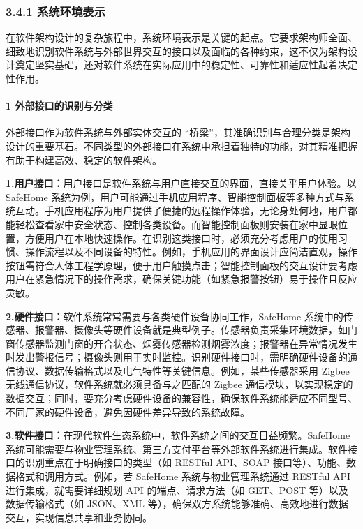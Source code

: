 \subsubsection{3.4.1 系统环境表示}\label{ux7cfbux7edfux73afux5883ux8868ux793a}

在软件架构设计的复杂旅程中，系统环境表示是关键的起点。它要求架构师全面、细致地识别软件系统与外部世界交互的接口以及面临的各种约束，这不仅为架构设计奠定坚实基础，还对软件系统在实际应用中的稳定性、可靠性和适应性起着决定性作用。

\paragraph{1 外部接口的识别与分类}\label{ux5916ux90e8ux63a5ux53e3ux7684ux8bc6ux522bux4e0eux5206ux7c7b}

外部接口作为软件系统与外部实体交互的 ``桥梁''，其准确识别与合理分类是架构设计的重要基石。不同类型的外部接口在系统中承担着独特的功能，对其精准把握有助于构建高效、稳定的软件架构。

\textbf{1.用户接口：}用户接口是软件系统与用户直接交互的界面，直接关乎用户体验。以 SafeHome 系统为例，用户可能通过手机应用程序、智能控制面板等多种方式与系统互动。手机应用程序为用户提供了便捷的远程操作体验，无论身处何地，用户都能轻松查看家中安全状态、控制各类设备。而智能控制面板则安装在家中显眼位置，方便用户在本地快速操作。在识别这类接口时，必须充分考虑用户的使用习惯、操作流程以及不同设备的特性。例如，手机应用的界面设计应简洁直观，操作按钮需符合人体工程学原理，便于用户触摸点击；智能控制面板的交互设计要考虑用户在紧急情况下的操作需求，确保关键功能（如紧急报警按钮）易于操作且反应灵敏。

\textbf{2.硬件接口：}软件系统常常需要与各类硬件设备协同工作，SafeHome 系统中的传感器、报警器、摄像头等硬件设备就是典型例子。传感器负责采集环境数据，如门窗传感器监测门窗的开合状态、烟雾传感器检测烟雾浓度；报警器在异常情况发生时发出警报信号；摄像头则用于实时监控。识别硬件接口时，需明确硬件设备的通信协议、数据传输格式以及电气特性等关键信息。例如，某些传感器采用 Zigbee 无线通信协议，软件系统就必须具备与之匹配的 Zigbee 通信模块，以实现稳定的数据交互；同时，要充分考虑硬件设备的兼容性，确保软件系统能适应不同型号、不同厂家的硬件设备，避免因硬件差异导致的系统故障。

\textbf{3.软件接口：}在现代软件生态系统中，软件系统之间的交互日益频繁。SafeHome 系统可能需要与物业管理系统、第三方支付平台等外部软件系统进行集成。软件接口的识别重点在于明确接口的类型（如 RESTful API、SOAP 接口等）、功能、数据格式和调用方式。例如，若 SafeHome 系统与物业管理系统通过 RESTful API 进行集成，就需要详细规划 API 的端点、请求方法（如 GET、POST 等）以及数据传输格式（如 JSON、XML 等），确保双方系统能够准确、高效地进行数据交互，实现信息共享和业务协同。

